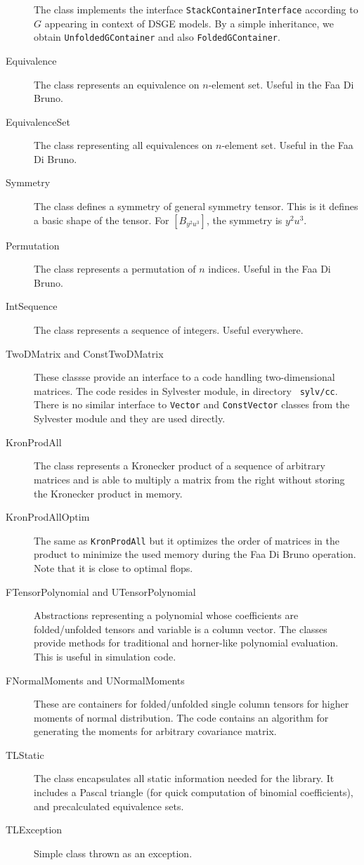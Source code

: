 \documentclass[11pt,a4paper]{article}
\begin{document}
\begin{description}
The class implements the interface \texttt{StackContainerInterface} according
to $G$ appearing in context of DSGE models. By a simple inheritance,
we obtain \texttt{UnfoldedGContainer} and also \texttt{FoldedGContainer}.
\item[Equivalence] 
The class represents an equivalence on $n$-element set. Useful in the
Faa Di Bruno.
\item[EquivalenceSet] 
The class representing all equivalences on $n$-element set. Useful in the
Faa Di Bruno.
\item[Symmetry] 
The class defines a symmetry of general symmetry tensor. This is it
defines a basic shape of the tensor. For $\left[B_{y^2u^3}\right]$,
the symmetry is $y^2u^3$.
\item[Permutation] 
The class represents a permutation of $n$ indices. Useful in the
Faa Di Bruno.
\item[IntSequence] 
The class represents a sequence of integers. Useful everywhere.
\item[TwoDMatrix and ConstTwoDMatrix] 
These classse provide an interface to a code handling two-dimensional
matrices. The code resides in Sylvester module, in directory {\tt
sylv/cc}. There is
no similar interface to \texttt{Vector} and \texttt{ConstVector} classes from the
Sylvester module and they are used directly.
\item[KronProdAll] 
The class represents a Kronecker product of a sequence of arbitrary
matrices and is able to multiply a matrix from the right without
storing the Kronecker product in memory.
\item[KronProdAllOptim] 
The same as \texttt{KronProdAll} but it optimizes the order of matrices in
the product to minimize the used memory during the Faa Di Bruno
operation. Note that it is close to optimal flops.
\item[FTensorPolynomial and UTensorPolynomial] 
Abstractions representing a polynomial whose coefficients are
folded/unfolded tensors and variable is a column vector. The classes
provide methods for traditional and horner-like polynomial
evaluation. This is useful in simulation code.
\item[FNormalMoments and UNormalMoments] 
These are containers for folded/unfolded single column tensors for
higher moments of normal distribution. The code contains an algorithm
for generating the moments for arbitrary covariance matrix.
\item[TLStatic] 
The class encapsulates all static information needed for the
library. It includes a Pascal triangle (for quick computation of
binomial coefficients), and precalculated equivalence sets.
\item[TLException] 
Simple class thrown as an exception.
\end{description}
\end{document}
